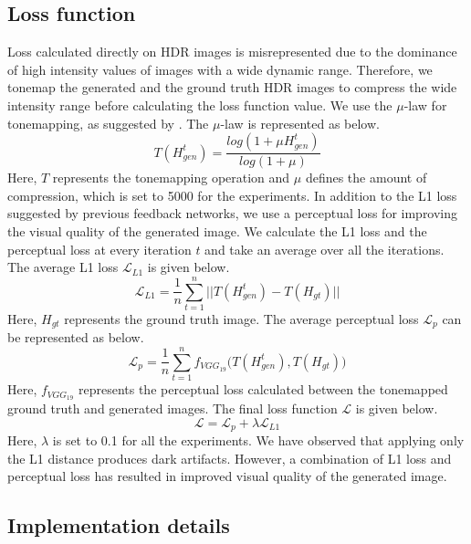 \documentclass[conference]{IEEEtran}
\begin{document}
\subsection{Loss function}
Loss calculated directly on HDR images is misrepresented due to the dominance of high intensity values of images with a wide dynamic range. Therefore, we tonemap the generated and the ground truth HDR images to compress the wide intensity range before calculating the loss function value. We use the $\mu$-law for tonemapping, as suggested by \cite{kalantari2017deep}. The $\mu$-law is represented as below.
\begin{equation}
T(H^t_{gen}) =  \frac{log(1+\mu H^t_{gen})}{log(1+\mu)}\label{eq}
\end{equation}
Here, $T$ represents the tonemapping operation and $\mu$ defines the amount of compression, which is set to 5000 for the experiments. In addition to the L1 loss suggested by previous feedback networks, we use a perceptual loss \cite{johnson2016perceptual} for improving the visual quality of the generated image.
We calculate the L1 loss and the perceptual loss at every iteration $t$ and take an average over all the iterations. The average L1 loss $\mathcal{L}_{L1}$ is given below.
\begin{equation}
\mathcal{L}_{L1}= \frac{1}{n}\sum_{t=1}^{n} \big|\big| T(H^t_{gen}) - T(H_{gt}) \big|\big|
\end{equation}
Here, $H_{gt}$ represents the ground truth image. The average perceptual loss $\mathcal{L}_p$ can be represented as below.
\begin{equation}
\mathcal{L}_p = \frac{1}{n}\sum_{t=1}^{n}f_{VGG_{19}}\big(T(H^t_{gen}), T(H_{gt})\big)\label{eq}
\end{equation}
Here, $f_{VGG_{19}}$ represents the perceptual loss calculated between the tonemapped ground truth and generated images.
The final loss function $\mathcal{L}$ is given below.
\begin{equation}
\mathcal{L} =\mathcal{L}_p + \lambda \mathcal{L}_{L1}\label{eq}
\end{equation}
Here, $\lambda$ is set to 0.1 for all the experiments.
We have observed that applying only the L1 distance produces dark artifacts.
However, a combination of L1 loss and perceptual loss has resulted in improved visual quality of the generated image.

\subsection{Implementation details}
\end{document}
